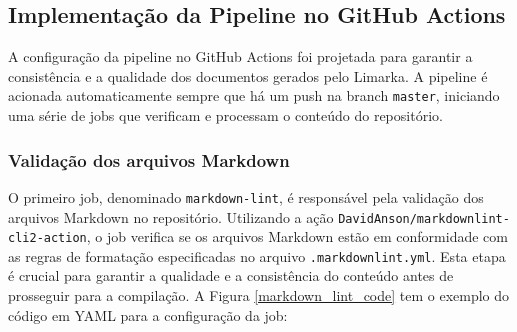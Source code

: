 \documentclass[
	12pt,				%
	oneside,			%
	a4paper,			%
	english,			%
	french,				%
	spanish,			%
	brazil				%
	]{abntex2}
\begin{document}
\hypertarget{implementauxe7uxe3o-da-pipeline-no-github-actions}{%
\subsection{Implementação da Pipeline no GitHub
Actions}\label{implementauxe7uxe3o-da-pipeline-no-github-actions}}

A configuração da pipeline no GitHub Actions foi projetada para garantir
a consistência e a qualidade dos documentos gerados pelo Limarka. A
pipeline é acionada automaticamente sempre que há um push na branch
\texttt{master}, iniciando uma série de jobs que verificam e processam o
conteúdo do repositório.

\hypertarget{validauxe7uxe3o-dos-arquivos-markdown}{%
\subsubsection{Validação dos arquivos
Markdown}\label{validauxe7uxe3o-dos-arquivos-markdown}}

O primeiro job, denominado \texttt{markdown-lint}, é responsável pela
validação dos arquivos Markdown no repositório. Utilizando a ação
\texttt{DavidAnson/markdownlint-cli2-action}, o job verifica se os
arquivos Markdown estão em conformidade com as regras de formatação
especificadas no arquivo \texttt{.markdownlint.yml}. Esta etapa é
crucial para garantir a qualidade e a consistência do conteúdo antes de
prosseguir para a compilação. A Figura \ref{markdown_lint_code} tem o
exemplo do código em YAML para a configuração da job:
\end{document}
